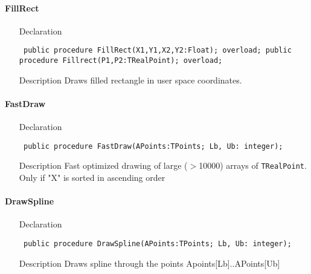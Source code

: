 \documentclass[12pt,a4paper,oneside]{report}
\newcommand{\declarationitem}[1]{{\addfontfeatures{FakeBold=1.3} #1}}
\newcommand{\descriptiontitle}[1]{{\addfontfeatures{FakeSlant}#1}}
\newcommand{\code}[1]{\texttt{#1}}
\begin{document}
\paragraph{FillRect}\hspace*{\fill}
\label{lmcoordsys.TCoordSys-FillRect}
\begin{itemize}\item[\declarationitem{Declaration}\hfill]
\begin{flushleft}
\code{
public procedure FillRect(X1,Y1,X2,Y2:Float); overload;
public procedure Fillrect(P1,P2:TRealPoint); overload;}
\end{flushleft}
\item[\descriptiontitle{Description}] Draws filled rectangle in user space coordinates.
\end{itemize}


\paragraph{FastDraw}\hspace*{\fill}\label{lmcoordsys.TCoordSys-FastDraw}
\begin{itemize}\item[\declarationitem{Declaration}\hfill]
\begin{flushleft}
\code{
public procedure FastDraw(APoints:TPoints; Lb, Ub: integer);}
\end{flushleft}
\item[\descriptiontitle{Description}]
Fast optimized drawing of large ({$>$}10000) arrays of \code{TRealPoint}. Only if "X" is sorted in ascending order
\end{itemize}
\paragraph{DrawSpline}\hspace*{\fill}\label{lmcoordsys.TCoordSys-DrawSpline}
\begin{itemize}\item[\declarationitem{Declaration}\hfill]
\begin{flushleft}
\code{
public procedure DrawSpline(APoints:TPoints; Lb, Ub: integer);}
\end{flushleft}
\item[\descriptiontitle{Description}]
Draws spline through the points Apoints[Lb]..APoints[Ub]
\end{itemize}
\end{document}
